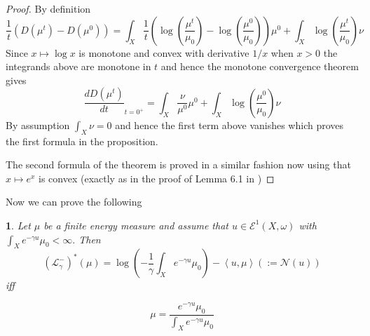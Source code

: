 \documentclass[11pt,oneside,english]{amsart}
\numberwithin{equation}{section}
\numberwithin{figure}{section}
\theoremstyle{plain}
\theoremstyle{plain}
\theoremstyle{plain}
\newtheorem{lem}[thm]{\protect\lemmaname}
\theoremstyle{plain}
\theoremstyle{remark}
\theoremstyle{definition}
\providecommand{\lemmaname}{Lemma}
\begin{document}
\begin{proof}
By definition 
\[
\frac{1}{t}\left(D(\mu^{t})-D(\mu^{0})\right)=\int_{X}\frac{1}{t}(\log(\frac{\mu^{t}}{\mu_{0}})-\log(\frac{\mu^{0}}{\mu_{0}}))\mu^{0}+\int_{X}\log(\frac{\mu^{t}}{\mu_{0}})\nu
\]
 Since $x\mapsto\log x$ is monotone and convex with derivative $1/x$
when $x>0$ the integrands above are monotone in $t$ and hence the
monotone convergence theorem gives 
\[
\frac{dD(\mu^{t})}{dt}_{t=0^{+}}=\int_{X}\frac{\nu}{\mu^{0}}\mu^{0}+\int_{X}\log(\frac{\mu^{0}}{\mu_{0}})\nu
\]
 By assumption $\int_{X}\nu=0$ and hence the first term above vanishes
which proves the first formula in the proposition.

The second formula of the theorem is proved in a similar fashion now
using that $x\mapsto e^{x}$ is convex (exactly as in the proof of
Lemma 6.1 in \cite{bbgz}) 
\end{proof}
Now we can prove the following 
\begin{lem}
\label{lem:sup of l attained}Let $\mu$ be a finite energy measure
and assume that $u\in\mathcal{E}^{1}(X,\omega)$ with $\int_{X}e^{-\gamma u}\mu_{0}<\infty.$
Then
\begin{equation}
(\mathcal{L}_{\gamma}^{-})^{*}(\mu)=\log(-\frac{1}{\gamma}\int_{X}e^{-\gamma u}\mu_{0})-\left\langle u,\mu\right\rangle (:=\mathcal{N}(u))\label{eq:max for l}
\end{equation}
 iff 
\end{lem}
\begin{equation}
\mu=\frac{e^{-\gamma u}\mu_{0}}{\int_{X}e^{-\gamma u}\mu_{0}}\label{eq:mu as exp}
\end{equation}
\end{document}

